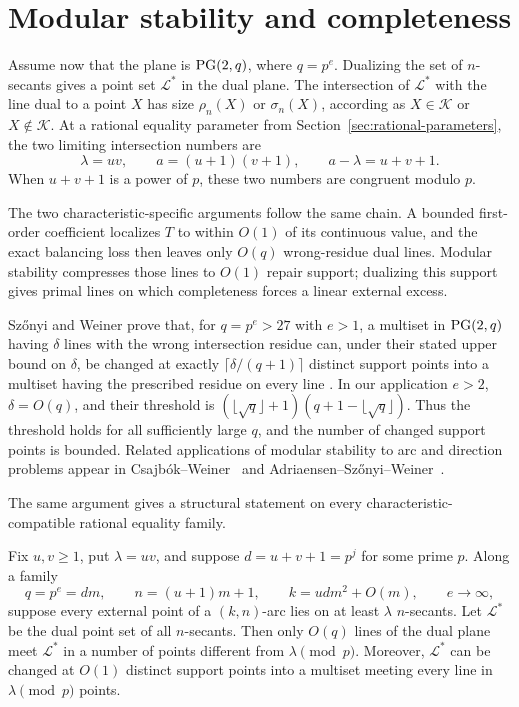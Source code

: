 \section{Modular stability and completeness}\label{sec:modular-stability}

Assume now that the plane is \(\mathrm{PG}(2,q)\), where \(q=p^e\).  Dualizing the
set of \(n\)-secants gives a point set \(\mathcal L^*\) in the dual plane.
The intersection of \(\mathcal L^*\) with the line dual to a point
\(X\) has size \(\rho_n(X)\) or \(\sigma_n(X)\), according as
\(X\in\mathcal K\) or \(X\notin\mathcal K\).  At a rational equality
parameter from Section~\ref{sec:rational-parameters}, the two limiting
intersection numbers are
\[
 \lambda=uv,\qquad a=(u+1)(v+1),\qquad a-\lambda=u+v+1.
\]
When \(u+v+1\) is a power of \(p\), these two numbers are congruent modulo
\(p\).

The two characteristic-specific arguments follow the same chain.  A bounded
first-order coefficient localizes \(T\) to within \(O(1)\) of its continuous
value, and the exact balancing loss then leaves only \(O(q)\) wrong-residue
dual lines.  Modular stability compresses those lines to \(O(1)\) repair
support; dualizing this support gives primal lines on which completeness
forces a linear external excess.

Sz\H{o}nyi and Weiner prove that, for \(q=p^e>27\) with \(e>1\), a multiset in
\(\mathrm{PG}(2,q)\) having \(\delta\) lines with the wrong intersection residue can,
under their stated upper bound on \(\delta\), be changed at exactly
\(\lceil\delta/(q+1)\rceil\) distinct support points into a multiset having
the prescribed residue on every line \cite[Theorem~1.2]{SWmodp}.  In our
application \(e>2\), \(\delta=O(q)\), and their threshold is
\((\lfloor\sqrt q\rfloor+1)(q+1-\lfloor\sqrt q\rfloor)\).  Thus the threshold
holds for all sufficiently large \(q\), and the number of changed support
points is bounded.  Related applications of
modular stability to arc and direction problems appear in
Csajb\'ok--Weiner~\cite{CsajbokWeiner} and
Adriaensen--Sz\H{o}nyi--Weiner~\cite{AdriaensenSzonyiWeiner}.

The same argument gives a structural statement on every
characteristic-compatible rational equality family.

\begin{proposition}
\label{prop:rational-family-stability}
Fix \(u,v\ge1\), put \(\lambda=uv\), and suppose
\(d=u+v+1=p^j\) for some prime \(p\).  Along a family
\[
 q=p^e=dm,\qquad n=(u+1)m+1,\qquad k=udm^2+O(m),
 \qquad e\longrightarrow\infty,
\]
suppose every external point of a \((k,n)\)-arc lies on at least
\(\lambda\) \(n\)-secants.  Let \(\mathcal L^*\) be the dual point set of all
\(n\)-secants.  Then only \(O(q)\) lines of the dual plane meet
\(\mathcal L^*\) in a number of points different from \(\lambda\pmod p\).
Moreover, \(\mathcal L^*\) can be changed at \(O(1)\) distinct support points
into a multiset meeting every line in \(\lambda\pmod p\) points.
\end{proposition}

